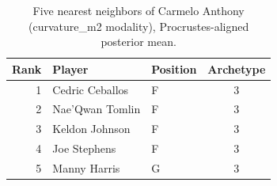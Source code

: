 \begin{table}[htbp]
  \centering\small
  \begin{tabular}{rllc}
    \toprule
    Rank & Player & Position & Archetype \\
    \midrule
    1 & Cedric Ceballos & F & 3 \\
    2 & Nae'Qwan Tomlin & F & 3 \\
    3 & Keldon Johnson & F & 3 \\
    4 & Joe Stephens & F & 3 \\
    5 & Manny Harris & G & 3 \\
    \bottomrule
  \end{tabular}
  \caption{Five nearest neighbors of Carmelo Anthony (curvature_m2 modality), Procrustes-aligned posterior mean.}
  \label{tab:Carmelo_Anthony_neighbors_curvature_m2}
\end{table}

